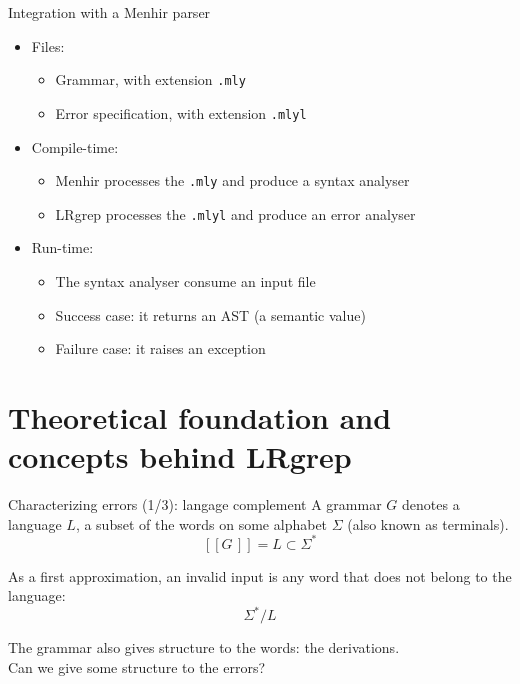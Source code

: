 \documentclass{beamer}          %
\begin{document}
\begin{frame}{Integration with a Menhir parser}

  \begin{itemize}
    \item Files:
      \begin{itemize}
      \item Grammar, with extension \texttt{.mly}
      \item<2-> Error specification, with extension \texttt{.mlyl}
      \end{itemize}
    \item Compile-time:
      \begin{itemize}
        \item Menhir processes the \texttt{.mly} and produce a syntax analyser
        \item<2-> LRgrep processes the \texttt{.mlyl} and produce an error analyser
      \end{itemize}
    \item Run-time:
      \begin{itemize}
        \item The syntax analyser consume an input file
        \item Success case: it returns an AST (a semantic value)
        \item Failure case: it raises an exception \\
      \end{itemize}
  \end{itemize}

\end{frame}

\section{Theoretical foundation and concepts behind LRgrep}

\begin{frame}{Characterizing errors (1/3): langage complement}
  A grammar $G$ denotes a language $L$, a subset of the words on some alphabet $\Sigma$ (also known as terminals).
  $$
  [\![G\,]\!] = L \subset \Sigma^*
  $$

  \pause
  As a first approximation, an invalid input is any word that does not belong to the language:
  $$
  \Sigma^* / L
  $$

  \pause
  The grammar also gives structure to the words: the derivations.
  \\
  Can we give some structure to the errors?
\end{frame}
\end{document}
